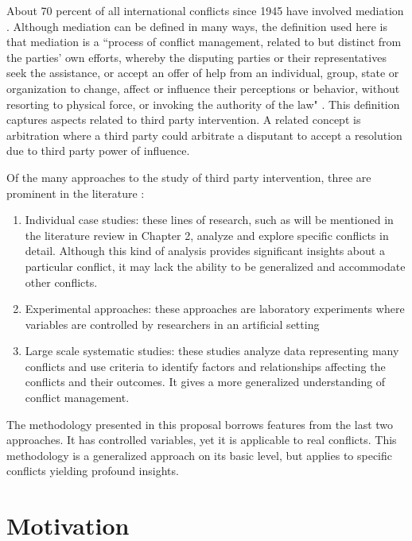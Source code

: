 \documentclass[letterpaper,12pt,titlepage,oneside,final]{book}
\begin{document}
About 70 percent of all international conflicts since 1945 have involved mediation . Although mediation can be defined in many ways, the definition used here is that mediation is a ``process of conflict management, related to but distinct from the parties' own efforts, whereby the disputing parties or their representatives seek the assistance, or accept an offer of help from an individual, group, state or organization to change, affect or influence their perceptions or behavior, without resorting to physical force, or invoking the authority of the law" \citep{bercovitch1992}. This definition captures aspects related to third party intervention. A related concept is arbitration where a third party could arbitrate a disputant to accept a resolution due to third party power of influence.

Of the many approaches to the study of third party intervention, three are prominent in the literature \citep{bercovitch2009} :

\begin{enumerate}
\item Individual case studies: these lines of research, such as will be mentioned in the literature review in Chapter 2, analyze and explore specific conflicts in detail. Although this kind of analysis provides significant insights about a particular conflict, it may lack the ability to be generalized and accommodate other conflicts.
\item Experimental approaches: these approaches are laboratory experiments where variables are controlled by researchers in an artificial setting \citep{rubin1980,carnevale2005}
\item Large scale systematic studies: these studies analyze data representing many conflicts and use criteria to identify factors and relationships affecting the conflicts and their outcomes. It gives a more generalized understanding of conflict management.

\end{enumerate}

The methodology presented in this proposal borrows features from the last two approaches. It has controlled variables, yet it is applicable to real conflicts. This methodology is a generalized approach on its basic level, but applies to specific conflicts yielding profound insights.

\section{Motivation}
\end{document}

